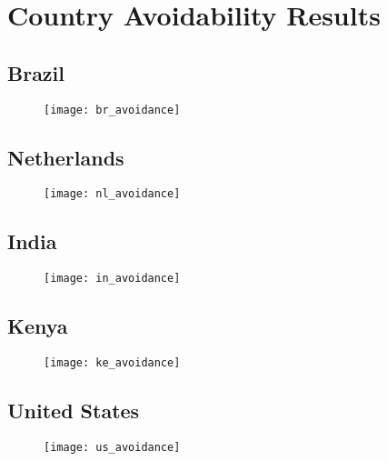\section{Country Avoidability Results}

\subsection{Brazil}

\begin{figure}
\centering
\texttt{[image: br\_avoidance]}
\label{fig:domains}
\end{figure}

\subsection{Netherlands}

\begin{figure}
\centering
\texttt{[image: nl\_avoidance]}
\label{fig:domains}
\end{figure}

\subsection{India}

\begin{figure}
\centering
\texttt{[image: in\_avoidance]}
\label{fig:domains}
\end{figure}

\subsection{Kenya}

\begin{figure}
\centering
\texttt{[image: ke\_avoidance]}
\label{fig:domains}
\end{figure}

\subsection{United States}

\begin{figure}
\centering
\texttt{[image: us\_avoidance]}
\label{fig:domains}
\end{figure}
